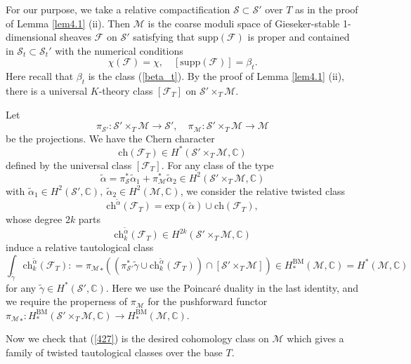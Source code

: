 \documentclass[11pt]{amsart}
\theoremstyle{plain}
\theoremstyle{definition}
\theoremstyle{remark}
\newcommand{\BC}{{\mathbb{C}}}
\newcommand{\CF}{{\mathcal F}}
\newcommand{\CM}{{\mathcal M}}
\newcommand{\CS}{{\mathcal S}}
\begin{document}
For our purpose, we take a relative compactification $\CS \subset \CS'$ over $T$ as in the proof of Lemma \ref{lem4.1} (ii). Then $\CM$ is the {coarse} moduli space of Gieseker-stable 1-dimensional sheaves $\CF$ on $\CS'$ satisfying that $\mathrm{supp}(\CF)$ is proper and contained in $\CS_t \subset \CS_t'$ with the numerical conditions
\[
\chi(\CF) = \chi, \quad [\mathrm{supp}(\CF)] = \beta_t.
\]
Here recall that $\beta_t$ is the class (\ref{beta_t}). By the proof of Lemma \ref{lem4.1} (ii), there is a universal $K$-theory class $[\CF_T]$ on $\CS' \times_T \CM$.

Let
\[
\pi_{\CS'}: \CS' \times_T \CM \to \CS', \quad \pi_\CM: \CS' \times_T \CM \to \CM
\]
be the projections. We have the Chern character 
\[
\mathrm{ch}({\CF_T}) \in H^*(\CS' \times_T \CM, \BC)
\]
defined by the universal class $[\CF_T]$. For any class of the type
\begin{equation}\label{alphatilde}
\tilde{\alpha} = \pi_\CS^* \tilde{\alpha}_1 + \pi_\CM^* \tilde{\alpha}_2 \in H^2(\CS' \times_T \CM, \BC)
\end{equation}
with $\tilde{\alpha}_1\in H^2(\CS', \BC),~ \tilde{\alpha}_2\in H^2(\CM, \BC)$, we consider the relative twisted class
\begin{equation}\label{456}
\mathrm{ch}^{\tilde{\alpha}}(\CF_T) = \mathrm{exp}(\tilde{\alpha})\cup \mathrm{ch}(\CF_T),
\end{equation}
whose degree $2k$ parts
\[
 \mathrm{ch}_k^{\tilde{\alpha}}(\CF_T) \in H^{2k}(\CS' \times_T \CM, \BC)
\]
induce a relative tautological class
\begin{equation}\label{427}
\int_{\tilde{\gamma}} \mathrm{ch}_k^{\tilde{\alpha}}(\CF_T): = {\pi_\CM}_* \left( (\pi_{\CS'}^*\tilde{\gamma} \cup  \mathrm{ch}_k^{\tilde{\alpha}}(\CF_T))\cap [\CS' \times_T \CM] \right) \in H_*^\mathrm{BM}(\CM,\BC) =H^*(\CM, \BC)
\end{equation}
for any $\tilde{\gamma}\in H^*(\CS', \BC)$. Here we use the Poincar\'e duality in the last identity, and we require the properness of $\pi_\CM$ for the pushforward functor ${\pi_\CM}_* : H^{\mathrm{BM}}_*(\CS' \times_T \CM, \BC) \to H^{\mathrm{BM}}_*(\CM, \BC)$.

Now we check that (\ref{427}) is the desired cohomology class on $\CM$ which gives a family of twisted tautological classes over the base $T$.
\end{document}
